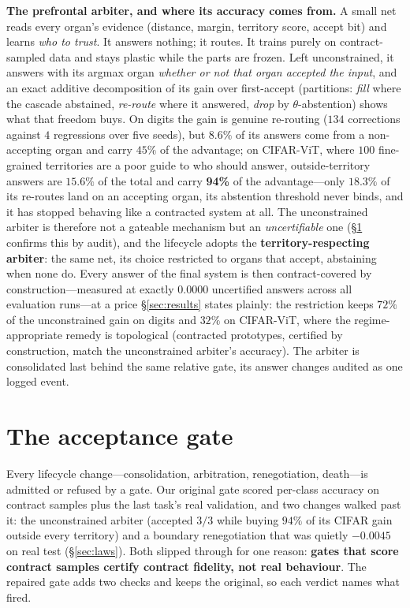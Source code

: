 \documentclass{article}
\begin{document}
\textbf{The prefrontal arbiter, and where its accuracy comes from.} A small
net reads every organ's evidence (distance, margin, territory score, accept
bit) and learns \emph{who to trust}. It answers nothing; it routes. It trains
purely on contract-sampled data and stays plastic while the parts are frozen.
Left unconstrained, it answers with its argmax organ \emph{whether or not that
organ accepted the input}, and an exact additive decomposition of its gain
over first-accept (partitions: \emph{fill} where the cascade abstained,
\emph{re-route} where it answered, \emph{drop} by $\theta$-abstention) shows
what that freedom buys. On digits the gain is genuine re-routing ($134$
corrections against $4$ regressions over five seeds), but $8.6\%$ of its
answers come from a non-accepting organ and carry $45\%$ of the advantage; on
CIFAR-ViT, where $100$ fine-grained territories are a poor guide to who should
answer, outside-territory answers are $15.6\%$ of the total and carry
\textbf{94\%} of the advantage---only $18.3\%$ of its re-routes land on an
accepting organ, its abstention threshold never binds, and it has stopped
behaving like a contracted system at all. The unconstrained arbiter is
therefore not a gateable mechanism but an \emph{uncertifiable} one
(\S\ref{sec:gate} confirms this by audit), and the lifecycle adopts the
\textbf{territory-respecting arbiter}: the same net, its choice restricted to
organs that accept, abstaining when none do. Every answer of the final system
is then contract-covered by construction---measured at exactly $0.0000$
uncertified answers across all evaluation runs---at a price \S\ref{sec:results}
states plainly: the restriction keeps $72\%$ of the unconstrained gain on
digits and $32\%$ on CIFAR-ViT, where the regime-appropriate remedy is
topological (contracted prototypes, certified by construction, match the
unconstrained arbiter's accuracy). The arbiter is consolidated last behind the
same relative gate, its answer changes audited as one logged event.

\section{The acceptance gate}\label{sec:gate}
Every lifecycle change---consolidation, arbitration, renegotiation, death---is
admitted or refused by a gate. Our original gate scored per-class accuracy on
contract samples plus the last task's real validation, and two changes walked
past it: the unconstrained arbiter (accepted $3/3$ while buying $94\%$ of its
CIFAR gain outside every territory) and a boundary renegotiation that was
quietly $-0.0045$ on real test (\S\ref{sec:laws}). Both slipped through for
one reason: \textbf{gates that score contract samples certify contract
fidelity, not real behaviour}. The repaired gate adds two checks and keeps the
original, so each verdict names what fired.
\end{document}
